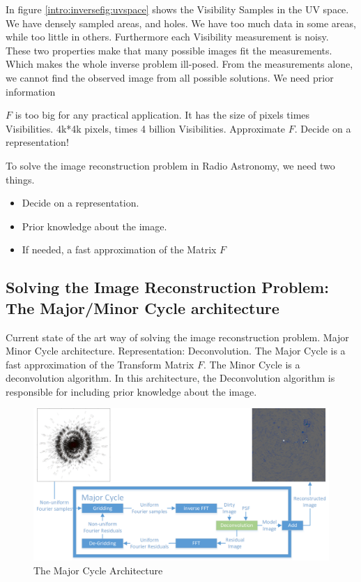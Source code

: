 In figure \ref{intro:inversefig:uvspace} shows the Visibility Samples in the UV space. We have densely sampled areas, and holes.
We have too much data in some areas, while too little in others. Furthermore each Visibility measurement is noisy. These two properties make that many possible images fit the measurements. Which makes the whole inverse problem ill-posed.
From the measurements alone, we cannot find the observed image from all possible solutions. We need prior information

$F$ is too big for any practical application. It has the size of pixels times Visibilities. 4k*4k pixels, times 4 billion Visibilities. Approximate $F$.
Decide on a representation!

To solve the image reconstruction problem in Radio Astronomy, we need two things.
\begin{itemize}
	\item Decide on a representation.
	\item Prior knowledge about the image.
	\item If needed, a fast approximation of the Matrix $F$
\end{itemize} 


\subsection{Solving the Image Reconstruction Problem: The Major/Minor Cycle architecture}
Current state of the art way of solving the image reconstruction problem. Major Minor Cycle architecture.
Representation: Deconvolution.
The Major Cycle is a fast approximation of the Transform Matrix $F$.
The Minor Cycle is a deconvolution algorithm. In this architecture, the Deconvolution algorithm is responsible for including prior knowledge about the image.

\begin{figure}[h]
	\centering
	\includegraphics[width=0.80\linewidth]{./chapters/02.hypo/Major-Minor3.png}
	\caption{The Major Cycle Architecture}
	\label{intro:major}
\end{figure}

